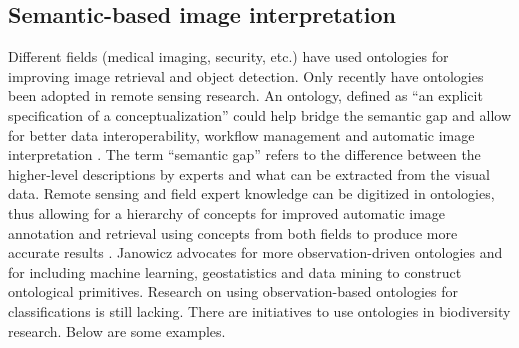 \documentclass[authoryear, review,12pt,number]{elsarticle}
\begin{document}
\subsection{Semantic-based image interpretation}
Different fields (medical imaging, security, etc.) have used ontologies for
improving image retrieval and object detection. Only recently have ontologies
been adopted in remote sensing research. An ontology, defined as ``an explicit
specification of a conceptualization'' \citep{gruber1993} could help bridge the
semantic gap and allow for better data interoperability, workflow management and
automatic image interpretation \citep{Arvor2013} \citep{Andres2013a}. The term
``semantic gap'' refers to the difference between the higher-level descriptions
by experts and what can be extracted from the visual data. Remote sensing and
field expert knowledge can be digitized in ontologies, thus allowing for a
hierarchy of concepts for improved automatic image annotation and retrieval
using concepts from both fields to produce more accurate results
\citep{Srikanth:2005:EOA:1076034.1076128}. Janowicz \citep{Janowicz2012}
advocates for more observation-driven ontologies and for including machine
learning, geostatistics and data mining to construct ontological primitives.
Research on using observation-based ontologies for classifications is still
lacking. There are initiatives to use ontologies in biodiversity research. Below
are some examples.
\end{document}
